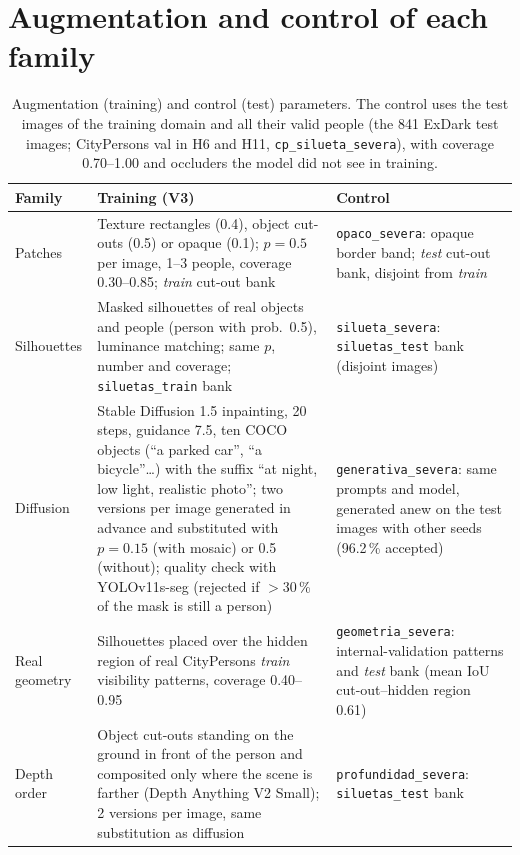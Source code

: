 \documentclass[10pt]{article}
\begin{document}
\section{Augmentation and control of each family}
\begin{table}[H]\centering\small
\caption{Augmentation (training) and control (test) parameters. The control uses the test images of the training domain and all their valid people (the 841 ExDark test images; CityPersons val in H6 and H11, \texttt{cp\_silueta\_severa}), with coverage 0.70--1.00 and occluders the model did not see in training.}
\begin{tabular}{@{}p{2.2cm}p{7.0cm}p{6.6cm}@{}}\toprule
Family & Training (V3) & Control \\\midrule
Patches & Texture rectangles (0.4), object cut-outs (0.5) or opaque (0.1); $p=0.5$ per image, 1--3 people, coverage 0.30--0.85; \emph{train} cut-out bank & \texttt{opaco\_severa}: opaque border band; \emph{test} cut-out bank, disjoint from \emph{train} \\
Silhouettes & Masked silhouettes of real objects and people (person with prob.\ 0.5), luminance matching; same $p$, number and coverage; \texttt{siluetas\_train} bank & \texttt{silueta\_severa}: \texttt{siluetas\_test} bank (disjoint images) \\
Diffusion & Stable Diffusion 1.5 inpainting, 20 steps, guidance 7.5, ten COCO objects (``a parked car'', ``a bicycle''\ldots) with the suffix ``at night, low light, realistic photo''; two versions per image generated in advance and substituted with $p=0.15$ (with mosaic) or 0.5 (without); quality check with YOLOv11s-seg (rejected if $>$30\,\% of the mask is still a person) & \texttt{generativa\_severa}: same prompts and model, generated anew on the test images with other seeds (96.2\,\% accepted) \\
Real geometry & Silhouettes placed over the hidden region of real CityPersons \emph{train} visibility patterns, coverage 0.40--0.95 & \texttt{geometria\_severa}: internal-validation patterns and \emph{test} bank (mean IoU cut-out--hidden region 0.61) \\
Depth order & Object cut-outs standing on the ground in front of the person and composited only where the scene is farther (Depth Anything V2 Small); 2 versions per image, same substitution as diffusion & \texttt{profundidad\_severa}: \texttt{siluetas\_test} bank \\
\bottomrule\end{tabular}\end{table}
\end{document}
